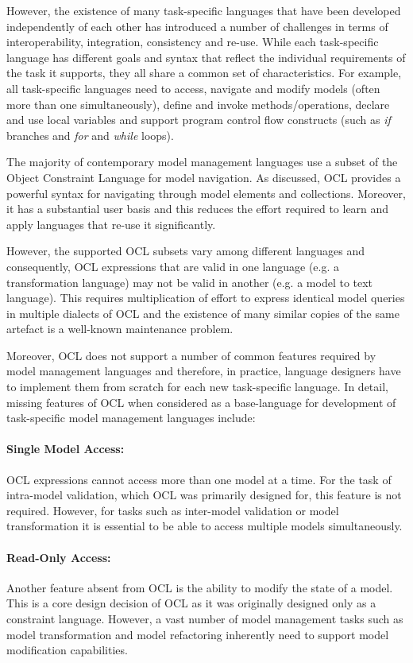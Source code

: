 However, the existence of many task-specific languages that have been developed independently of each other has introduced a number of challenges in terms of interoperability, integration, consistency and re-use. While each task-specific language has different goals and syntax that reflect the individual requirements of the task it supports, they all share a common set of characteristics. For example, all task-specific languages need to access, navigate and modify models (often more than one simultaneously), define and invoke methods/operations, declare and use local variables and support program control flow constructs (such as \textit{if} branches and \textit{for} and \textit{while} loops).

The majority of contemporary model management languages use a subset of the Object Constraint Language \cite{OCL} for model navigation. As discussed, OCL provides a powerful syntax for navigating through model elements and collections. Moreover, it has a substantial user basis and this reduces the effort required to learn and apply languages that re-use it significantly.

However, the supported OCL subsets vary among different languages and consequently, OCL expressions that are valid in one language (e.g. a transformation language) may not be valid in another (e.g. a model to text language). This requires multiplication of effort to express identical model queries in multiple dialects of OCL and the existence of many similar copies of the same artefact is a well-known maintenance problem.

Moreover, OCL does not support a number of common features required by model management languages and therefore, in practice, language designers have to implement them from scratch for each new task-specific language. In detail, missing features of OCL when considered as a base-language for development of task-specific model management languages include:

\paragraph{Single Model Access:} OCL expressions cannot access more than one model at a time. For the task of intra-model validation, which OCL was primarily designed for, this feature is not required. However, for tasks such as inter-model validation or model transformation it is essential to be able to access multiple models simultaneously.

\paragraph{Read-Only Access:} Another feature absent from OCL is the ability to modify the state of a model. This is a core design decision of OCL as it was originally designed only as a constraint language. However, a vast number of model management tasks such as model transformation and model refactoring inherently need to support model modification capabilities.

